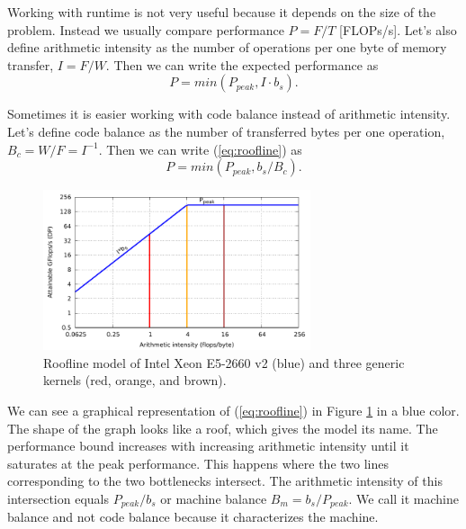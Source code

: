 Working with runtime is not very useful because it depends on the size of the problem. Instead we usually compare performance $P=F/T$ [FLOPs/s].
Let's also define arithmetic intensity as the number of operations per one byte of memory transfer, $I=F/W$. Then we can write the expected performance as
\begin{equation}
   P = min(P_{peak}, I \cdot b_s). \label{eq:roofline}
\end{equation}

Sometimes it is easier working with code balance instead of arithmetic intensity. Let's define code balance as the number of transferred bytes per one operation, $B_c=W/F=I^{-1}$. Then we can write (\ref{eq:roofline}) as
\begin{equation}
   P = min(P_{peak}, b_s/B_c). \label{eq:roofline_balance}
\end{equation}

\begin{figure}[t]
   \centering
   \includegraphics[width=0.7\textwidth,clip=true]{images/roofline/roofline_emmy_Xeon2660v2_naive.pdf}
   \caption{Roofline model of Intel Xeon E5-2660 v2 (blue) and three generic kernels (red, orange, and brown).}
  \label{fig:roofline_emmy_naive}
\end{figure}

We can see a graphical representation of (\ref{eq:roofline}) in Figure \ref{fig:roofline_emmy_naive} in a blue color. The shape of the graph looks like a roof, which gives the model its name.
The performance bound increases with increasing arithmetic intensity until it saturates at the peak performance. This happens where the two lines corresponding to the two bottlenecks intersect. The arithmetic intensity of this intersection equals $P_{peak}/b_s$ or machine balance $B_m=b_s/P_{peak}$. We call it machine balance and not code balance because it characterizes the machine.

